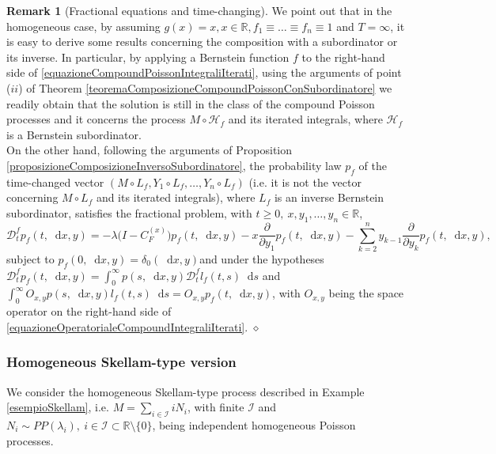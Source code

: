 \documentclass[12pt, twoside, english, headsepline]{article}
\newcommand*\dif{\mathop{}\!\mathrm{d}}  %
\theoremstyle{definition} %
\newtheorem{remark}{Remark}[section] %
\numberwithin{equation}{section} %
\begin{document}
\begin{remark}[Fractional equations and time-changing]
	
We point out that in the homogeneous case, by assuming $g(x)=x,x\in\mathbb{R}, f_1\equiv\dots\equiv f_n\equiv1$ and $T=\infty$, it is easy to derive some results concerning the composition with a subordinator or its inverse. In particular, by applying a Bernstein function $f$ to the right-hand side of \eqref{equazioneCompoundPoissonIntegraliIterati}, using the arguments of point ($ii$) of Theorem \ref{teoremaComposizioneCompoundPoissonConSubordinatore} we readily obtain that the solution is still in the class of the compound Poisson processes and it concerns the process $M\circ \mathcal{H}_f$ and its iterated integrals, where $\mathcal{H}_f$ is a Bernstein subordinator.
\\

On the other hand, following the arguments of Proposition \ref{proposizioneComposizioneInversoSubordinatore}, the probability law $p_f$ of the time-changed vector $(M\circ L_f, Y_1\circ L_f,\dots, Y_n\circ L_f)$ (i.e. it is not the vector concerning $M\circ L_f$ and its iterated integrals), where $L_f$ is an inverse Bernstein subordinator, satisfies the fractional problem, with $t\ge0,\ x,y_1,\dots,y_n\in \mathbb{R}$,
\begin{equation}\label{equazioneOperatorialeCompoundIntegraliIterati}
	\mathcal{D}_t^f p_f(t,\dif x,y) = -\lambda\Big(I-C_F^{(x)}\Big) p_f(t,\dif x,y) - x \frac{\partial}{\partial y_1}p_f(t, \dif x, y) - \sum_{k=2}^n y_{k-1} \frac{\partial}{\partial y_{k}}p_f(t, \dif x, y),
\end{equation}
subject to $p_f(0,\dif x,y) = \delta_0(\dif x,y)$and under the hypotheses $\mathcal{D}_t^f p_f(t,\dif x,y) = \int_0^\infty p(s,\dif x,y) \mathcal{D}_t^f l_f(t,s)\dif s$
and $\int_0^\infty O_{x,y}p(s, \dif x, y)l_f(t,s)\dif s = O_{x,y} p_f(t,\dif x, y)$, with $O_{x,y}$ being the space operator on the right-hand side of \eqref{equazioneOperatorialeCompoundIntegraliIterati}.
\hfill$\diamond$
\end{remark}

\subsubsection{Homogeneous Skellam-type version}

We consider the homogeneous Skellam-type process described in Example \ref{esempioSkellam}, i.e. $M = \sum_{i \in\mathcal{I} } i N_i$, with finite $\mathcal{I}$ and $N_i\sim PP(\lambda_i), \ i\in\mathcal{I}\subset \mathbb{R}\setminus \{0\}$, being independent homogeneous Poisson processes. 
\end{document}
